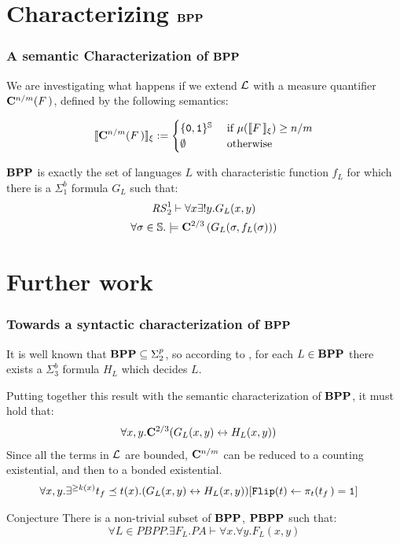 \documentclass[xcolor={x11names}]{beamer}
\begin{document}
\section{Characterizing $\mathbf{BPP}$}


\begin{frame}
\frametitle{A semantic Characterization of $\mathbf{BPP}$}

We are investigating what happens if we extend $\mathcal{L}$ with a measure quantifier $\mathbf{C}^{n/m}(F\,)$, defined by the following semantics:

\[
\llbracket\mathbf{C}^{n/m}(F\,)\rrbracket_\xi := \begin{cases}
\{\mathtt{0}, \mathtt{1}\}^{\mathbb{S}} & \text{ if } \mu (\llbracket F\, \rrbracket_\xi)\ge n/m\\
\emptyset & \text{ otherwise }
\end{cases}
\]

\pause

\begin{corollary}\label{cor:bpp}
$\mathbf{BPP}$ is exactly the set of languages $L$ with characteristic function $f_L$
for which there is a $\Sigma^b_1$ formula $G_L$ such that:
\begin{gather*}
{\mathit{RS}^1_2} \vdash \forall x \exists ! y. G_L(x, y)\\
\forall \sigma \in \mathbb{S}.\models \mathbf{C}^{2/3} \left( G_L(\sigma,f_L(\sigma)) \right)
\end{gather*}
\end{corollary}
\end{frame}



\section{Further work}

\begin{frame}
\frametitle{Towards a syntactic characterization of $\mathbf{BPP}$}

It is well known that $\mathbf{BPP} \subseteq \Sigma^p_2$, so according to \cite{Buss}, for each $L \in \mathbf{BPP}$ there exists a $\Sigma^b_3$ formula $H_L$ which decides $L$.

Putting together this result with the semantic characterization of $\mathbf{BPP}$, it must hold that:
\vspace{-2mm}
\begin{align*}
\forall x, y. \mathbf{C}^{2/3} (G_L(x, y)&\leftrightarrow H_L(x, y))
\end{align*}
\medskip
Since all the terms in $\mathcal{L}$ are bounded, $\mathbf{C}^{n/m}$ can be reduced to a counting existential, and then to a bonded existential.
\begin{align*}
\forall x, y. \exists^{\ge k(x)}t_f\preceq t(x). (G_L(x, y)&\leftrightarrow H_L(x, y))[\mathtt{Flip}(t)\leftarrow \pi_{t}(t_f\,)=\mathtt{1}]
\end{align*}

\begin{block}{Conjecture}
There is a non-trivial subset of $\mathbf{BPP}$, $\mathbf{PBPP}$ such that:
\[
\forall L\in \mathit{PBPP}.\exists F_L. PA \vdash \forall x. \forall y.F_L(x, y)
\]
\end{block}

\end{frame}
\end{document}
